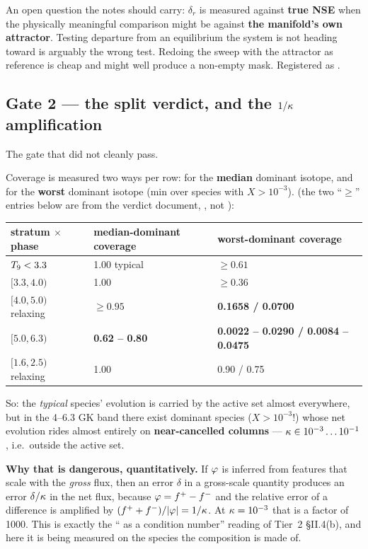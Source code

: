 An open question the notes should carry: $\delta_r$ is measured against
\textbf{true NSE} when the physically meaningful comparison might be against
\textbf{the manifold's own attractor}. Testing departure from an equilibrium the
system is not heading toward is arguably the wrong test. Redoing the sweep with
the attractor as reference is cheap and might well produce a non-empty mask.
Registered as .

\subsection{Gate 2 --- the split verdict, and the \texorpdfstring{$1/\kappa$}{1/kappa} amplification}
\label{sec:gate2}

The gate that did not cleanly pass.

Coverage is measured two ways per row: for the \textbf{median} dominant
isotope, and for the \textbf{worst} dominant isotope (min over species with
$X > 10^{-3}$).  (the two ``$\ge$'' entries below are
from the verdict document, , not
):

\begingroup\small
\begin{tabularx}{\textwidth}{@{}L{3.6cm} L{4.2cm} Y@{}}
\toprule
\textbf{stratum $\times$ phase} & \textbf{median-dominant coverage} &
  \textbf{worst-dominant coverage} \\
\midrule
$T_{9} < 3.3$ & 1.00 typical & $\ge 0.61$ \\
$[3.3, 4.0)$ & 1.00 & $\ge 0.36$ \\
$[4.0, 5.0)$ relaxing & $\ge 0.95$ & \textbf{0.1658 / 0.0700} \\
$[5.0, 6.3)$ & \textbf{0.62 -- 0.80} & \textbf{0.0022 -- 0.0290 / 0.0084 -- 0.0475} \\
$[1.6, 2.5)$ relaxing & 1.00 & 0.90 / 0.75 \\
\bottomrule
\end{tabularx}
\endgroup

So: the \emph{typical} species' evolution is carried by the active set almost
everywhere, but in the 4--6.3 GK band there exist dominant species
($X > 10^{-3}$!) whose net evolution rides almost entirely on
\textbf{near-cancelled columns} --- $\kappa \in 10^{-3} \ldots 10^{-1}$, i.e.\
outside the active set.

\textbf{Why that is dangerous, quantitatively.} If $\varphi$ is inferred from
features that scale with the \emph{gross} flux, then an error $\delta$ in a
gross-scale quantity produces an error $\delta/\kappa$ in the net flux, because
$\varphi = f^{+} - f^{-}$ and the relative error of a difference is amplified by
$(f^{+} + f^{-})/|\varphi| = 1/\kappa$. At $\kappa = 10^{-3}$ that is a factor of
1000. This is exactly the ``\kap{} as a condition number'' reading of Tier~2
\S II.4(b), and here it is being measured on the species the composition is
made of.

